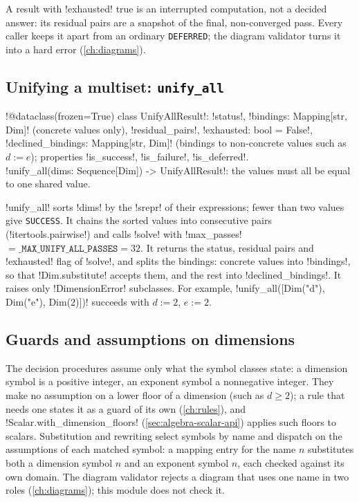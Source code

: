 A result with \code!exhausted! true is an interrupted computation, not a decided answer: its residual pairs are a snapshot of the final, non-converged pass. Every caller keeps it apart from an ordinary \texttt{DEFERRED}; the diagram validator turns it into a hard error (\cref{ch:diagrams}).

\subsection{Unifying a multiset: \texttt{unify\_all}}

\begin{signature}
\py!@dataclass(frozen=True) class UnifyAllResult!: \py!status!, \py!bindings: Mapping[str, Dim]! (concrete values only), \py!residual_pairs!, \py!exhausted: bool = False!, \py!declined_bindings: Mapping[str, Dim]! (bindings to non-concrete values such as $d:=e$); properties \py!is_success!, \py!is_failure!, \py!is_deferred!.\\
\py!unify_all(dims: Sequence[Dim]) -> UnifyAllResult!: the values must all be equal to one shared value.
\end{signature}

\py!unify_all! sorts \code!dims! by the \py!srepr! of their expressions; fewer than two values give \texttt{SUCCESS}. It chains the sorted values into consecutive pairs (\py!itertools.pairwise!) and calls \py!solve! with \code!max_passes! $=\mathtt{\_MAX\_UNIFY\_ALL\_PASSES}=32$. It returns the status, residual pairs and \code!exhausted! flag of \py!solve!, and splits the bindings: concrete values into \code!bindings!, so that \py!Dim.substitute! accepts them, and the rest into \code!declined_bindings!. It raises only \py!DimensionError! subclasses. For example, \py!unify_all([Dim("d"), Dim("e"), Dim(2)])! succeeds with $d:=2$, $e:=2$.

\subsection{Guards and assumptions on dimensions}\label{sec:algebra-dim-guards}

The decision procedures assume only what the symbol classes state: a dimension symbol is a positive integer, an exponent symbol a nonnegative integer. They make no assumption on a lower floor of a dimension (such as $d\ge 2$); a rule that needs one states it as a guard of its own (\cref{ch:rules}), and \py!Scalar.with_dimension_floors! (\cref{sec:algebra-scalar-api}) applies such floors to scalars. Substitution and rewriting select symbols by name and dispatch on the assumptions of each matched symbol: a mapping entry for the name $n$ substitutes both a dimension symbol $n$ and an exponent symbol $n$, each checked against its own domain. The diagram validator rejects a diagram that uses one name in two roles (\cref{ch:diagrams}); this module does not check it.

